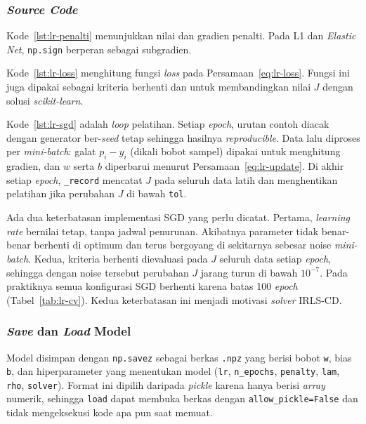 \subsubsection{\textit{Source Code}}
Kode~\ref{lst:lr-penalti} menunjukkan nilai dan gradien penalti. Pada L1 dan \textit{Elastic Net}, \texttt{np.sign} berperan sebagai subgradien.


Kode~\ref{lst:lr-loss} menghitung fungsi \textit{loss} pada Persamaan~\eqref{eq:lr-loss}. Fungsi ini juga dipakai sebagai kriteria berhenti dan untuk membandingkan nilai $J$ dengan solusi \textit{scikit-learn}.


Kode~\ref{lst:lr-sgd} adalah \textit{loop} pelatihan. Setiap \textit{epoch}, urutan contoh diacak dengan generator ber-\textit{seed} tetap sehingga hasilnya \textit{reproducible}. Data lalu diproses per \textit{mini-batch}: galat $p_i - y_i$ (dikali bobot sampel) dipakai untuk menghitung gradien, dan $w$ serta $b$ diperbarui menurut Persamaan~\eqref{eq:lr-update}. Di akhir setiap \textit{epoch}, \texttt{\_record} mencatat $J$ pada seluruh data latih dan menghentikan pelatihan jika perubahan $J$ di bawah \texttt{tol}.


Ada dua keterbatasan implementasi SGD yang perlu dicatat. Pertama, \textit{learning rate} bernilai tetap, tanpa jadwal penurunan. Akibatnya parameter tidak benar-benar berhenti di optimum dan terus bergoyang di sekitarnya sebesar noise \textit{mini-batch}. Kedua, kriteria berhenti dievaluasi pada $J$ seluruh data setiap \textit{epoch}, sehingga dengan noise tersebut perubahan $J$ jarang turun di bawah $10^{-7}$. Pada praktiknya semua konfigurasi SGD berhenti karena batas 100 \textit{epoch} (Tabel~\ref{tab:lr-cv}). Kedua keterbatasan ini menjadi motivasi \textit{solver} IRLS-CD.

\subsubsection{\textit{Save} dan \textit{Load} Model}
Model disimpan dengan \texttt{np.savez} sebagai berkas \texttt{.npz} yang berisi bobot \texttt{w}, bias \texttt{b}, dan hiperparameter yang menentukan model (\texttt{lr}, \texttt{n\_epochs}, \texttt{penalty}, \texttt{lam}, \texttt{rho}, \texttt{solver}). Format ini dipilih daripada \textit{pickle} karena hanya berisi \textit{array} numerik, sehingga \texttt{load} dapat membuka berkas dengan \texttt{allow\_pickle=False} dan tidak mengeksekusi kode apa pun saat memuat.


